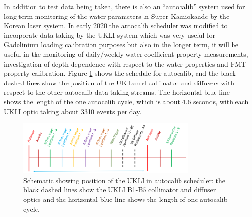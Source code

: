 \begin{figure}[!htbp]
    
\end{figure}

In addition to test data being taken, there is also an ``autocalib'' system used for long term monitoring of the water parameters in Super-Kamiokande by the Korean laser system. In early 2020 the autocalib scheduler was modified to incorporate data taking by the UKLI system which was very useful for Gadolinium loading calibration purposes but also in the longer term, it will be useful in the monitoring of daily/weekly water coefficient property measurements, investigation of depth dependence with respect to the water properties and PMT property calibration. Figure \ref{fig:autocalib} shows the schedule for autocalib, and the black dashed lines show the position of the UK barrel collimator and diffusers with respect to the other autocalib data taking streams. The horizontal blue line shows the length of the one autocalib cycle, which is about 4.6 seconds, with each UKLI optic taking about 3310 events per day.

\begin{figure}
    \centering
    \includegraphics[width=0.8\textwidth]{Figures/autocalib.png}
    \caption{Schematic showing position of the UKLI in autocalib scheduler: the black dashed lines show the UKLI B1-B5 collimator and diffuser optics and the horizontal blue line shows the length of one autocalib cycle.}
    \label{fig:autocalib}
\end{figure}

